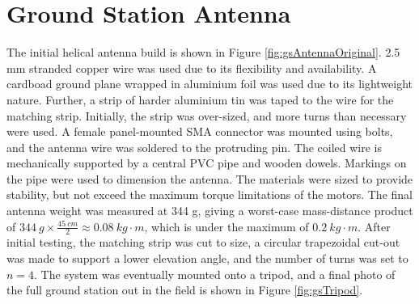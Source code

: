 \graphicspath{{./figures}}

\section{Ground Station Antenna}

The initial helical antenna build is shown in Figure \ref{fig:gsAntennaOriginal}. 2.5 mm stranded copper wire was used due to its flexibility and availability. A cardboad ground plane wrapped in aluminium foil was used due to its lightweight nature. Further, a strip of harder aluminium tin was taped to the wire for the matching strip. Initially, the strip was over-sized, and more turns than necessary were used. A female panel-mounted SMA connector was mounted using bolts, and the antenna wire was soldered to the protruding pin. The coiled wire is mechanically supported by a central PVC pipe and wooden dowels. Markings on the pipe were used to dimension the antenna. The materials were sized to provide stability, but not exceed the maximum torque limitations of the motors. The final antenna weight was measured at 344 g, giving a worst-case mass-distance product of $\SI{344}{g} \times \frac{\SI{45}{cm}}{2} \approx \SI{0.08}{kg \cdot m}$, which is under the maximum of $\SI{0.2}{kg \cdot m}$. After initial testing, the matching strip was cut to size, a circular trapezoidal cut-out was made to support a lower elevation angle, and the number of turns was set to $n=4$. The system was eventually mounted onto a tripod, and a final photo of the full ground station out in the field is shown in Figure \ref{fig:gsTripod}.

